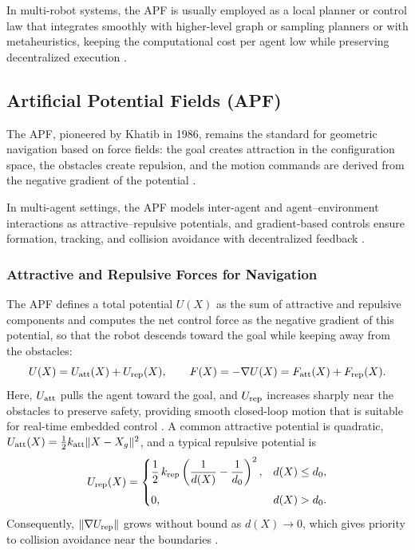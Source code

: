 In multi-robot systems, the APF is usually employed as a local planner or control
law that integrates smoothly with higher-level graph or sampling planners or with
metaheuristics, keeping the computational cost per agent low while preserving
decentralized execution \cite{wang2022coordination}.

\subsection{Artificial Potential Fields (APF)}

The APF, pioneered by Khatib in 1986, remains the standard for geometric
navigation based on force fields: the goal creates attraction in the
configuration space, the obstacles create repulsion, and the motion commands are
derived from the negative gradient of the potential \cite{khatib1986real}.

In multi-agent settings, the APF models inter-agent and agent--environment
interactions as attractive--repulsive potentials, and gradient-based controls
ensure formation, tracking, and collision avoidance with decentralized feedback
\cite{wang2018research}.

\subsubsection{Attractive and Repulsive Forces for Navigation}

The APF defines a total potential $U(X)$ as the sum of attractive and repulsive
components and computes the net control force as the negative gradient of this
potential, so that the robot descends toward the goal while keeping away from the
obstacles:
\begin{equation}
  U(X) = U_{\mathrm{att}}(X) + U_{\mathrm{rep}}(X), \qquad
  F(X) = -\nabla U(X) = F_{\mathrm{att}}(X) + F_{\mathrm{rep}}(X).
  \label{eq:apf}
\end{equation}
Here, $U_{\mathrm{att}}$ pulls the agent toward the goal, and $U_{\mathrm{rep}}$ increases sharply
near the obstacles to preserve safety, providing smooth closed-loop motion that
is suitable for real-time embedded control \cite{wang2022coordination}. A common
attractive potential is quadratic, $U_{\mathrm{att}}(X) = \tfrac{1}{2} k_{\mathrm{att}}
\|X - X_g\|^2$, and a typical repulsive potential is
\begin{equation}
  U_{\mathrm{rep}}(X) =
  \begin{cases}
    \dfrac{1}{2}\,k_{\mathrm{rep}}\left(\dfrac{1}{d(X)} - \dfrac{1}{d_0}\right)^{2},
      & d(X) \le d_0, \\[2.5ex]
    0, & d(X) > d_0.
  \end{cases}
  \label{eq:apf-repulsive}
\end{equation}
Consequently, $\|\nabla U_{\mathrm{rep}}\|$ grows without bound as $d(X) \to 0$, which
gives priority to collision avoidance near the boundaries \cite{zhao2020multi}.

